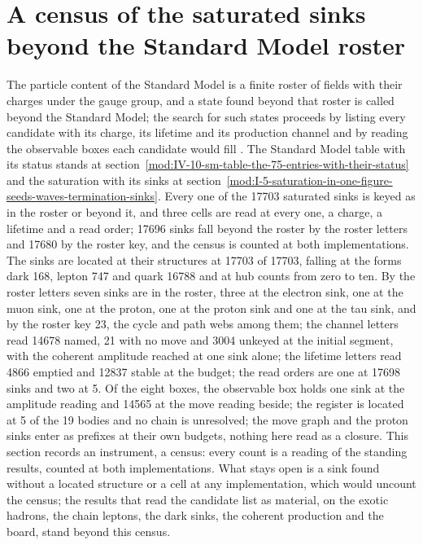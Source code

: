 \section{A census of the saturated sinks beyond the Standard Model roster}\label{mod:IV-10-D539336-the-bsm-census-release-one}
The particle content of the Standard Model is a finite roster of fields with their charges under the gauge group, and a state found beyond that roster is called beyond the Standard Model; the search for such states proceeds by listing every candidate with its charge, its lifetime and its production channel and by reading the observable boxes each candidate would fill \cite{Glashow1961,Weinberg1967,Griffiths2008}. The Standard Model table with its status stands at section~\ref{mod:IV-10-sm-table-the-75-entries-with-their-status} and the saturation with its sinks at section~\ref{mod:I-5-saturation-in-one-figure-seeds-waves-termination-sinks}.
Every one of the 17703 saturated sinks is keyed as in the roster or beyond it, and three cells are read at every one, a charge, a lifetime and a read order; 17696 sinks fall beyond the roster by the roster letters and 17680 by the roster key, and the census is counted at both implementations.
The sinks are located at their structures at 17703 of 17703, falling at the forms dark 168, lepton 747 and quark 16788 and at hub counts from zero to ten. By the roster letters seven sinks are in the roster, three at the electron sink, one at the muon sink, one at the proton, one at the proton sink and one at the tau sink, and by the roster key 23, the cycle and path webs among them; the channel letters read 14678 named, 21 with no move and 3004 unkeyed at the initial segment, with the coherent amplitude reached at one sink alone; the lifetime letters read 4866 emptied and 12837 stable at the budget; the read orders are one at 17698 sinks and two at 5. Of the eight boxes, the observable box holds one sink at the amplitude reading and 14565 at the move reading beside; the register is located at 5 of the 19 bodies and no chain is unresolved; the move graph and the proton sinks enter as prefixes at their own budgets, nothing here read as a closure.
This section records an instrument, a census: every count is a reading of the standing results, counted at both implementations.
What stays open is a sink found without a located structure or a cell at any implementation, which would uncount the census; the results that read the candidate list as material, on the exotic hadrons, the chain leptons, the dark sinks, the coherent production and the board, stand beyond this census.

